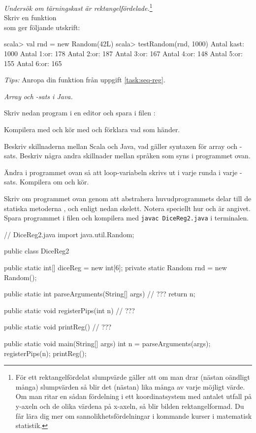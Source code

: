 \Task \emph{Undersök om tärningskast är rektangelfördelade.}\footnote{För ett rektangelfördelat slumpvärde gäller att om man drar (nästan oändligt många) slumpvärden så blir det (nästan) lika många av varje möjligt värde. Om man ritar en sådan fördelning i ett koordinatsystem med antalet utfall på y-axeln och de olika värdena på x-axeln, så blir bilden rektangelformad. Du får lära dig mer om sannolikhetsfördelningar i kommande kurser i matematisk statistik.} \\Skriv en funktion  \\ som ger följande utskrift:\begin{REPL}
scala> val rnd = new Random(42L)
scala> testRandom(rnd, 1000)
Antal kast: 1000
Antal 1:or: 178
Antal 2:or: 187
Antal 3:or: 167
Antal 4:or: 148
Antal 5:or: 155
Antal 6:or: 165
\end{REPL}

\emph{Tips:} 
Anropa din funktion  från uppgift \ref{task:seq-reg}.


\Task \emph{Array och -sats i Java.} 

\Subtask Skriv nedan program i en editor och spara i filen :


\Subtask Kompilera med  och kör med  och förklara vad som händer.

\Subtask\Pen Beskriv skillnaderna mellan Scala och Java, vad gäller syntaxen för array och -sats. Beskriv några andra skillnader mellan språken som syns i programmet ovan.

\Subtask Ändra i programmet ovan så att loop-variabeln  skrivs ut i varje runda i varje -sats. Kompilera om och kör.

\Subtask Skriv om programmet ovan genom att abstrahera huvudprogrammets delar till de statiska metoderna ,  och  enligt nedan skelett. Notera speciellt hur  och  är angivet. Spara programmet i filen  och kompilera med \texttt{javac DiceReg2.java} i terminalen.

\begin{Code}[language=Java]
// DiceReg2.java
import java.util.Random;

public class DiceReg2 {
    public static int[] diceReg = new int[6];  
    private static Random rnd = new Random();

    public static int parseArguments(String[] args) {
        // ???
        return n;        
    }
    
    public static void registerPips(int n){
        // ???
    }
    
    public static void printReg() {
        // ???
    }

    public static void main(String[] args) {
        int n = parseArguments(args);
        registerPips(n);
        printReg();
    }
}
\end{Code}

